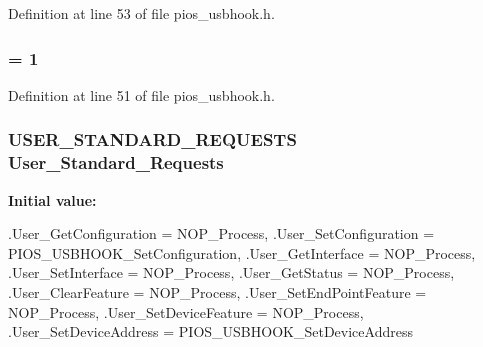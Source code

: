 \-Definition at line 53 of file pios\-\_\-usbhook.\-h.

\hypertarget{group___p_i_o_s___u_s_b_h_o_o_k_ga05f051e48c96e9d6d2e05804c8023fe2}{
\subsubsection[{\-U\-S\-B\-\_\-\-S\-T\-R\-I\-N\-G\-\_\-\-D\-E\-S\-C\-\_\-\-V\-E\-N\-D\-O\-R}]{ = 1}}\label{group___p_i_o_s___u_s_b_h_o_o_k_ga05f051e48c96e9d6d2e05804c8023fe2}


\-Definition at line 51 of file pios\-\_\-usbhook.\-h.

\hypertarget{group___p_i_o_s___u_s_b_h_o_o_k_ga8d70d0a7e05cf9c172e4304def6b65b8}{
\subsubsection[{\-User\-\_\-\-Standard\-\_\-\-Requests}]{\setlength{\rightskip}{0pt plus 5cm}\-U\-S\-E\-R\-\_\-\-S\-T\-A\-N\-D\-A\-R\-D\-\_\-\-R\-E\-Q\-U\-E\-S\-T\-S {\bf \-User\-\_\-\-Standard\-\_\-\-Requests}}}\label{group___p_i_o_s___u_s_b_h_o_o_k_ga8d70d0a7e05cf9c172e4304def6b65b8}
{\bfseries \-Initial value\-:}
\begin{DoxyCode}
 {
        .User_GetConfiguration   = NOP_Process,
        .User_SetConfiguration   = PIOS_USBHOOK_SetConfiguration,
        .User_GetInterface       = NOP_Process,
        .User_SetInterface       = NOP_Process,
        .User_GetStatus          = NOP_Process,
        .User_ClearFeature       = NOP_Process,
        .User_SetEndPointFeature = NOP_Process,
        .User_SetDeviceFeature   = NOP_Process,
        .User_SetDeviceAddress   = PIOS_USBHOOK_SetDeviceAddress
}
\end{DoxyCode}


